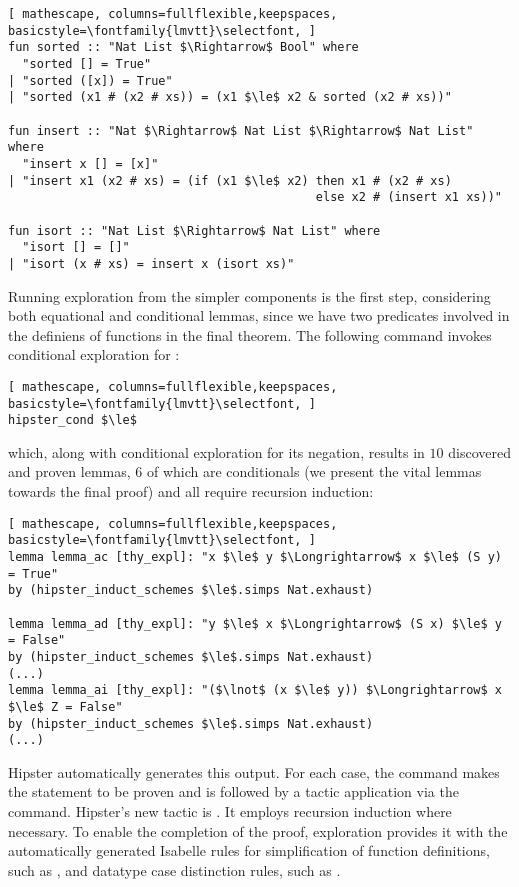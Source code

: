 \begin{lstlisting}[ mathescape, columns=fullflexible,keepspaces, basicstyle=\fontfamily{lmvtt}\selectfont, ]
fun sorted :: "Nat List $\Rightarrow$ Bool" where
  "sorted [] = True"
| "sorted ([x]) = True"
| "sorted (x1 # (x2 # xs)) = (x1 $\le$ x2 & sorted (x2 # xs))"

fun insert :: "Nat $\Rightarrow$ Nat List $\Rightarrow$ Nat List" where
  "insert x [] = [x]"
| "insert x1 (x2 # xs) = (if (x1 $\le$ x2) then x1 # (x2 # xs)	
                                           else x2 # (insert x1 xs))"

fun isort :: "Nat List $\Rightarrow$ Nat List" where
  "isort [] = []"
| "isort (x # xs) = insert x (isort xs)"
\end{lstlisting}

Running exploration from the simpler components is the first step, considering both equational and conditional lemmas, since we have two predicates involved in the definiens of functions in the final theorem.
%
The following command invokes conditional exploration for \isaCode{$\le$}:

\begin{lstlisting}[ mathescape, columns=fullflexible,keepspaces, basicstyle=\fontfamily{lmvtt}\selectfont, ]
hipster_cond $\le$
\end{lstlisting}

\noindent which, along with conditional exploration for its negation, results in $10$ discovered and proven lemmas, $6$ of which are conditionals (we present the vital lemmas towards the final proof) and all require recursion induction:

\begin{lstlisting}[ mathescape, columns=fullflexible,keepspaces, basicstyle=\fontfamily{lmvtt}\selectfont, ]
lemma lemma_ac [thy_expl]: "x $\le$ y $\Longrightarrow$ x $\le$ (S y) = True"
by (hipster_induct_schemes $\le$.simps Nat.exhaust)

lemma lemma_ad [thy_expl]: "y $\le$ x $\Longrightarrow$ (S x) $\le$ y = False"
by (hipster_induct_schemes $\le$.simps Nat.exhaust)
(...)
lemma lemma_ai [thy_expl]: "($\lnot$ (x $\le$ y)) $\Longrightarrow$ x $\le$ Z = False"
by (hipster_induct_schemes $\le$.simps Nat.exhaust)
(...)
\end{lstlisting}

\noindent Hipster automatically generates this output.
%
For each case, the  command makes the statement to be proven and is followed by a tactic application via the  command.
%
Hipster's new tactic is .
%
It employs recursion induction where necessary.
%
To enable the completion of the proof, exploration provides it with the automatically generated Isabelle rules for simplification of function definitions, such as , and datatype case distinction rules, such as .

